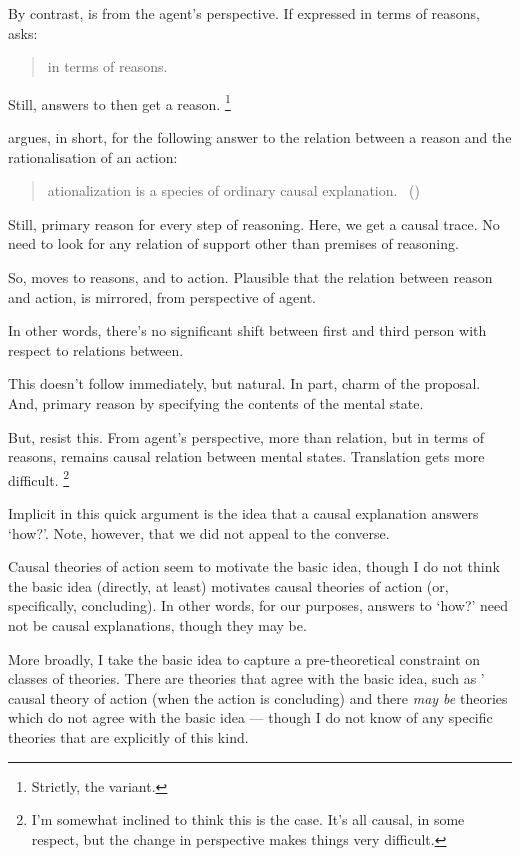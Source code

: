 \begin{note}
  By contrast, \qWhy{} is from the agent's perspective.
  If expressed in terms of reasons, \qWhy{} asks:

  \begin{quote}
    \color{red}
    \qWhy{} in terms of reasons.
  \end{quote}

  Still, answers to \qWhy{} then get a reason.%
  \footnote{
    Strictly, the variant.
  }

  \citeauthor{Davidson:1963aa} argues, in short, for the following answer to the relation between a reason and the rationalisation of an action:

  \begin{quote}
    \begin{enumerate}[label=\arabic*]
      [R]ationalization is a species of ordinary causal explanation.\newline
      \mbox{ }\hfill\mbox{(\citeyear[685]{Davidson:1963aa})}
    \end{enumerate}
  \end{quote}

  Still, primary reason for every step of reasoning.
  Here, we get a causal trace.
  No need to look for any relation of support other than premises of reasoning.

  So, \citeauthor{Davidson:1963aa} moves to reasons, and to action.
  Plausible that the relation between reason and action, is mirrored, from perspective of agent.

  In other words, there's no significant shift between first and third person with respect to relations between.

  This doesn't follow immediately, but natural.
  In part, charm of the proposal.
  And, primary reason by specifying the contents of the mental state.

  But, resist this.
  From agent's perspective, more than relation, but in terms of reasons, remains causal relation between mental states.
  Translation gets more difficult.%
  \footnote{
    I'm somewhat inclined to think this is the case.
    It's all causal, in some respect, but the change in perspective makes things very difficult.
  }

  Implicit in this quick argument is the idea that a causal explanation answers `how?'.
  Note, however, that we did not appeal to the converse.

  Causal theories of action seem to motivate the basic idea, though I do not think the basic idea (directly, at least) motivates causal theories of action (or, specifically, concluding).
  In other words, for our purposes, answers to `how?' need not be causal explanations, though they may be.

  More broadly, I take the basic idea to capture a pre-theoretical constraint on classes of theories.
  There are theories that agree with the basic idea, such as \citeauthor{Davidson:1963aa}' causal theory of action (when the action is concluding) and there \emph{may be} theories which do not agree with the basic idea --- though I do not know of any specific theories that are explicitly of this kind.
\end{note}

